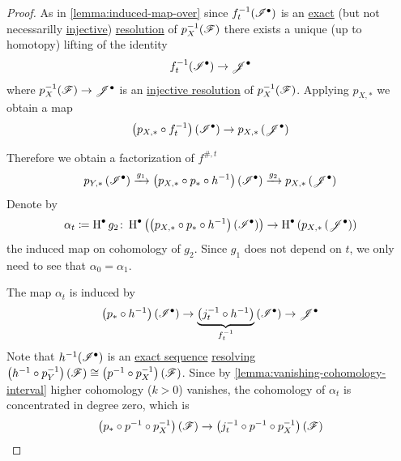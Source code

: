 \documentclass[../../main]{subfiles}
\begin{document}
\begin{proof}
  As in \autoref{lemma:induced-map-over} since \(f_{t}^{-1}(\mathscr{I}^{\bullet})\) is an \hyperref[def:exact-sequence]{exact} (but not necessarilly \hyperref[def:injective-projective-object]{injective}) \hyperref[def:resolution]{resolution} of \(p_{X}^{-1}(\mathscr{F})\) there exists a unique (up to homotopy) lifting of the identity
  \begin{equation*}
    f_{t}^{-1}(\mathscr{I}^{\bullet}) \to \mathscr{J}^{\bullet}
  \end{equation*}
  where \(p_{X}^{-1}(\mathscr{F}) \to \mathscr{J}^{\bullet}\) is an \hyperref[def:resolution]{injective resolution} of \(p_{X}^{-1}(\mathscr{F})\).
  Applying \(p_{X, \ast}\) we obtain a map
  \begin{equation*}
    \left( p_{X, \ast} \circ f_{t}^{-1} \right) \left( \mathscr{I}^{\bullet} \right) \to p_{X, \ast} \left( \mathscr{J}^{\bullet} \right)
  \end{equation*}

  Therefore we obtain a factorization of \(f^{\#, t}\)
  \begin{equation*}
    p_{Y, \ast}\left(\mathscr{I}^{\bullet}\right) \xrightarrow{g_{1}} \left( p_{X, \ast} \circ p_{\ast} \circ h^{-1} \right) \left( \mathscr{I}^{\bullet} \right) \xrightarrow{g_{2}} p_{X, \ast}\left(\mathscr{J}^{\bullet}\right)
  \end{equation*}
  Denote by
  \begin{equation*}
    \alpha_{t} \coloneq \operatorname{H}^{\bullet}g_{2}\colon \operatorname{H}^{\bullet} \left( \left( p_{X, \ast} \circ p_{\ast} \circ h^{-1} \right) \left( \mathscr{I}^{\bullet} \right) \right) \to \operatorname{H}^{\bullet} \left( p_{X, \ast}\left(\mathscr{J}^{\bullet}\right) \right)
  \end{equation*}
  the induced map on cohomology of \(g_{2}\).
  Since \(g_{1}\) does not depend on \(t\), we only need to see that \(\alpha_{0} = \alpha_{1}\).
  
  The map \(\alpha_{t}\) is induced by
  \begin{equation*}
    \left( p_{\ast} \circ h^{-1} \right) \left( \mathscr{I}^{\bullet} \right) \to \underbrace{\left( j_{t}^{-1} \circ h^{-1} \right)}_{f_{t}^{-1}} \left( \mathscr{I}^{\bullet} \right) \to \mathscr{J}^{\bullet}
  \end{equation*}
  Note that \(h^{-1}(\mathscr{I}^{\bullet})\) is an \hyperref[def:exact-sequence]{exact sequence} \hyperref[def:resolution]{resolving} \(\left( h^{-1} \circ p_{Y}^{-1} \right) \left( \mathscr{F} \right) \cong \left( p^{-1} \circ p_{X}^{-1} \right) \left( \mathscr{F} \right)\).
  Since by \autoref{lemma:vanishing-cohomology-interval} higher cohomology (\(k > 0\)) vanishes, the cohomology of \(\alpha_{t}\) is concentrated in degree zero, which is
  \begin{equation*}
    \left( p_{\ast} \circ p^{-1} \circ p_{X}^{-1} \right) \left( \mathscr{F} \right) \to \left( j_{t}^{-1} \circ p^{-1} \circ p_{X}^{-1} \right) \left( \mathscr{F} \right)
  \end{equation*}


\end{proof}
\end{document}

